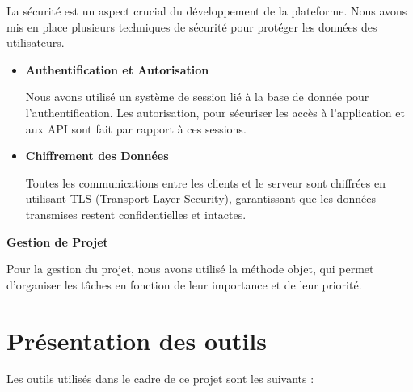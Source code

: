   La sécurité est un aspect crucial du développement de la plateforme. Nous
  avons mis en place plusieurs techniques de sécurité pour protéger les données
  des utilisateurs.
  \begin{itemize}
    \item \textbf{{Authentification et Autorisation}}

      Nous avons utilisé un système de session lié à la base de donnée pour
      l'authentification. Les autorisation, pour sécuriser les accès
      à l'application et aux API sont fait par rapport à ces sessions.

    \item \textbf{{Chiffrement des Données}}

      Toutes les communications entre les clients et le serveur sont chiffrées
      en utilisant TLS (Transport Layer Security), garantissant que les données
      transmises restent confidentielles et intactes.
  \end{itemize}

\textbf{Gestion de Projet}

Pour la gestion du projet, nous avons utilisé la méthode objet, qui permet
d'organiser les tâches en fonction de leur importance et de leur priorité.


\section{Présentation des outils}
Les outils utilisés dans le cadre de ce projet sont les suivants :

